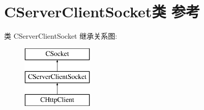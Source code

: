 \hypertarget{class_c_server_client_socket}{}\section{C\+Server\+Client\+Socket类 参考}
\label{class_c_server_client_socket}
类 C\+Server\+Client\+Socket 继承关系图\+:\begin{figure}[H]
\begin{center}
\leavevmode
\includegraphics[height=3.000000cm]{class_c_server_client_socket}
\end{center}
\end{figure}
